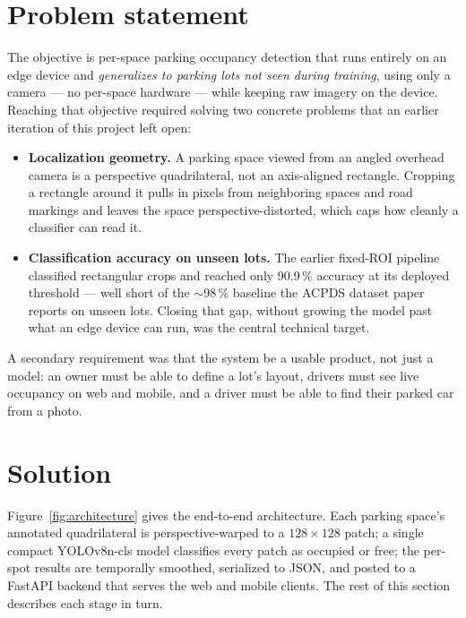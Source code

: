 \documentclass[10pt,twocolumn,letterpaper]{article}
\begin{document}
\section{Problem statement}

The objective is per-space parking occupancy detection that runs entirely
on an edge device and \emph{generalizes to parking lots not seen during
training}, using only a camera --- no per-space hardware --- while keeping
raw imagery on the device. Reaching that objective required solving two
concrete problems that an earlier iteration of this project left open:

\begin{itemize}
  \item \textbf{Localization geometry.} A parking space viewed from an
        angled overhead camera is a perspective quadrilateral, not an
        axis-aligned rectangle. Cropping a rectangle around it pulls in
        pixels from neighboring spaces and road markings and leaves the
        space perspective-distorted, which caps how cleanly a classifier
        can read it.
  \item \textbf{Classification accuracy on unseen lots.} The earlier
        fixed-ROI pipeline classified rectangular crops and reached only
        90.9\,\% accuracy at its deployed threshold --- well short of the
        $\sim$98\,\% baseline the ACPDS dataset paper~\cite{marek2021imagebased}
        reports on unseen lots. Closing that gap, without growing the
        model past what an edge device can run, was the central technical
        target.
\end{itemize}

A secondary requirement was that the system be a usable product, not just
a model: an owner must be able to define a lot's layout, drivers must see
live occupancy on web and mobile, and a driver must be able to find their
parked car from a photo.

\section{Solution}
\label{sec:solution}

Figure~\ref{fig:architecture} gives the end-to-end architecture. Each
parking space's annotated quadrilateral is perspective-warped to a
$128\times128$ patch; a single compact YOLOv8n-cls model classifies every
patch as occupied or free; the per-spot results are temporally smoothed,
serialized to JSON, and posted to a FastAPI backend that serves the web
and mobile clients. The rest of this section describes each stage in turn.
\end{document}
